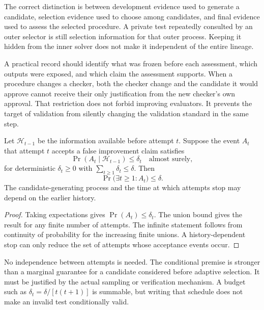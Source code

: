 The correct distinction is between development evidence used to generate a candidate, selection evidence used to choose among candidates, and final evidence used to assess the selected procedure. A private test repeatedly consulted by an outer selector is still selection information for that outer process. Keeping it hidden from the inner solver does not make it independent of the entire lineage.

A practical record should identify what was frozen before each assessment, which outputs were exposed, and which claim the assessment supports. When a procedure changes a checker, both the checker change and the candidate it would approve cannot receive their only justification from the new checker's own approval. That restriction does not forbid improving evaluators. It prevents the target of validation from silently changing the validation standard in the same step.

\begin{SIIproposition}\label{SII:prop:lineage}
Let $\mathcal H_{t-1}$ be the information available before attempt $t$. Suppose the event $A_t$ that attempt $t$ accepts a false improvement claim satisfies
\[
\Pr(A_t\mid\mathcal H_{t-1})\leq\delta_t
\quad\text{almost surely},
\]
for deterministic $\delta_t\geq0$ with $\sum_{t\geq1}\delta_t\leq\delta$. Then
\[
\Pr\big(\exists t\geq1:A_t\big)\leq\delta.
\]
The candidate-generating process and the time at which attempts stop may depend on the earlier history.
\end{SIIproposition}
\begin{proof}
Taking expectations gives $\Pr(A_t)\leq\delta_t$. The union bound gives the result for any finite number of attempts. The infinite statement follows from continuity of probability for the increasing finite unions. A history-dependent stop can only reduce the set of attempts whose acceptance events occur.
\end{proof}

No independence between attempts is needed. The conditional premise is stronger than a marginal guarantee for a candidate considered before adaptive selection. It must be justified by the actual sampling or verification mechanism. A budget such as $\delta_t=\delta/[t(t+1)]$ is summable, but writing that schedule does not make an invalid test conditionally valid.

